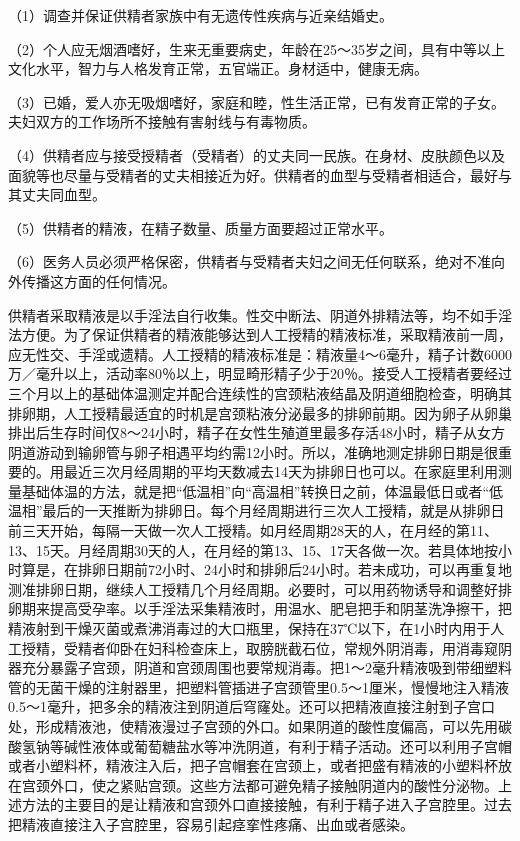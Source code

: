 \documentclass[12pt,UTF8]{ctexbook}
\begin{document}
（1）调查并保证供精者家族中有无遗传性疾病与近亲结婚史。

（2）个人应无烟酒嗜好，生来无重要病史，年龄在25～35岁之间，具有中等以上文化水平，智力与人格发育正常，五官端正。身材适中，健康无病。

（3）已婚，爱人亦无吸烟嗜好，家庭和睦，性生活正常，已有发育正常的子女。夫妇双方的工作场所不接触有害射线与有毒物质。

（4）供精者应与接受授精者（受精者）的丈夫同一民族。在身材、皮肤颜色以及面貌等也尽量与受精者的丈夫相接近为好。供精者的血型与受精者相适合，最好与其丈夫同血型。

（5）供精者的精液，在精子数量、质量方面要超过正常水平。

（6）医务人员必须严格保密，供精者与受精者夫妇之间无任何联系，绝对不准向外传播这方面的任何情况。

供精者采取精液是以手淫法自行收集。性交中断法、阴道外排精法等，均不如手淫法方便。为了保证供精者的精液能够达到人工授精的精液标准，采取精液前一周，应无性交、手淫或遗精。人工授精的精液标准是：精液量4～6毫升，精子计数6000万／毫升以上，活动率80％以上，明显畸形精子少于20％。接受人工授精者要经过三个月以上的基础体温测定并配合连续性的宫颈粘液结晶及阴道细胞检查，明确其排卵期，人工授精最适宜的时机是宫颈粘液分泌最多的排卵前期。因为卵子从卵巢排出后生存时间仅8～24小时，精子在女性生殖道里最多存活48小时，精子从女方阴道游动到输卵管与卵子相遇平均约需12小时。所以，准确地测定排卵日期是很重要的。用最近三次月经周期的平均天数减去14天为排卵日也可以。在家庭里利用测量基础体温的方法，就是把“低温相”向“高温相”转换日之前，体温最低日或者“低温相”最后的一天推断为排卵日。每个月经周期进行三次人工授精，就是从排卵日前三天开始，每隔一天做一次人工授精。如月经周期28天的人，在月经的第11、13、15天。月经周期30天的人，在月经的第13、15、17天各做一次。若具体地按小时算是，在排卵日期前72小时、24小时和排卵后24小时。若未成功，可以再重复地测准排卵日期，继续人工授精几个月经周期。必要时，可以用药物诱导和调整好排卵期来提高受孕率。以手淫法采集精液时，用温水、肥皂把手和阴茎洗净擦干，把精液射到干燥灭菌或煮沸消毒过的大口瓶里，保持在37℃以下，在1小时内用于人工授精，受精者仰卧在妇科检查床上，取膀胱截石位，常规外阴消毒，用消毒窥阴器充分暴露子宫颈，阴道和宫颈周围也要常规消毒。把1～2毫升精液吸到带细塑料管的无菌干燥的注射器里，把塑料管插进子宫颈管里0.5～1厘米，慢慢地注入精液0.5～1毫升，把多余的精液注到阴道后穹窿处。还可以把精液直接注射到子宫口处，形成精液池，使精液漫过子宫颈的外口。如果阴道的酸性度偏高，可以先用碳酸氢钠等碱性液体或葡萄糖盐水等冲洗阴道，有利于精子活动。还可以利用子宫帽或者小塑料杯，精液注入后，把子宫帽套在宫颈上，或者把盛有精液的小塑料杯放在宫颈外口，使之紧贴宫颈。这些方法都可避免精子接触阴道内的酸性分泌物。上述方法的主要目的是让精液和宫颈外口直接接触，有利于精子进入子宫腔里。过去把精液直接注入子宫腔里，容易引起痉挛性疼痛、出血或者感染。
\end{document}
